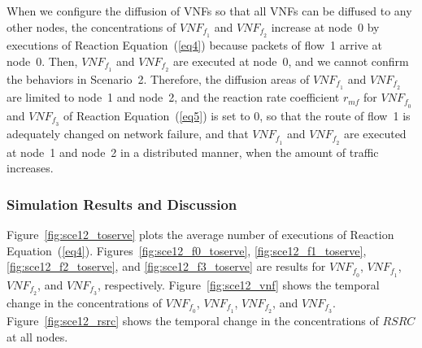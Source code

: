 \documentclass[technicalreport]{ieicej}
\begin{document}
	When we configure the diffusion of VNFs so that all VNFs can be diffused to any other nodes, the concentrations of $\mathit{VNF_{f_1}}$ and $\mathit{VNF_{f_2}}$ increase at node~0 by executions of Reaction Equation~(\ref{eq4}) because packets of flow~1 arrive at node~0.
	Then, $\mathit{VNF_{f_1}}$ and $\mathit{VNF_{f_2}}$ are executed at node~0, and we cannot confirm the behaviors in Scenario~2.
	Therefore, the diffusion areas of $\mathit{VNF_{f_1}}$ and $\mathit{VNF_{f_2}}$ are limited to node~1 and node~2, and the reaction rate coefficient $\mathit{r_{mf}}$ for $\mathit{VNF_{f_0}}$ and $\mathit{VNF_{f_3}}$ of Reaction Equation~(\ref{eq5}) is set to 0, so that the route of flow~1 is adequately changed on network failure, and that $\mathit{VNF_{f_1}}$ and $\mathit{VNF_{f_2}}$ are executed at node~1 and node~2 in a distributed manner, when the amount of traffic increases.

	\subsubsection{Simulation Results and Discussion}
	Figure~\ref{fig:sce12_toserve} plots the average number of executions of Reaction Equation~(\ref{eq4}).
	Figures~\ref{fig:sce12_f0_toserve}, \ref{fig:sce12_f1_toserve}, \ref{fig:sce12_f2_toserve}, and \ref{fig:sce12_f3_toserve} are results for $\mathit{VNF_{f_0}}$, $\mathit{VNF_{f_1}}$, $\mathit{VNF_{f_2}}$, and $\mathit{VNF_{f_3}}$, respectively.
	Figure~\ref{fig:sce12_vnf} shows the temporal change in the concentrations of $\mathit{VNF_{f_0}}$, $\mathit{VNF_{f_1}}$, $\mathit{VNF_{f_2}}$, and $\mathit{VNF_{f_3}}$.
	Figure~\ref{fig:sce12_rsrc} shows the temporal change in the concentrations of $\mathit{RSRC}$ at all nodes.
\end{document}
